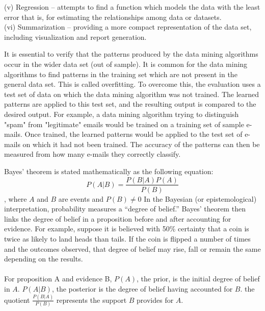 \documentclass[12pt]{article}
\begin{document}
(v) Regression – attempts to find a function which models the data with the least error that is, for estimating the relationships among data or datasets. \\

(vi) Summarization – providing a more compact representation of the data set, including visualization and report generation. \\
\newline

It is essential to verify that the patterns produced by the data mining algorithms occur in the wider data set (out of sample). It is common for the data mining algorithms to find patterns in the training set which are not present in the general data set. This is called overfitting. To overcome this, the evaluation uses a test set of data on which the data mining algorithm was not trained. The learned patterns are applied to this test set, and the resulting output is compared to the desired output. For example, a data mining algorithm trying to distinguish "spam" from "legitimate" emails would be trained on a training set of sample e-mails. Once trained, the learned patterns would be applied to the test set of e-mails on which it had not been trained. The accuracy of the patterns can then be measured from how many e-mails they correctly classify. \\
\newline

Bayes' theorem is stated mathematically as the following equation:
$$ P(A|B)= \frac {P(B|A) P(A)}{P(B)} $$ \newline
, where $A$ and $B$ are events and $P(B)\neq 0$
\newline
\newline
In the Bayesian (or epistemological) interpretation, probability measures a “degree of belief.” Bayes’ theorem then links the degree of belief in a proposition before and after accounting for evidence. For example, suppose it is believed with 50\% certainty that a coin is twice as likely to land heads than tails. If the coin is flipped a number of times and the outcomes observed, that degree of belief may rise, fall or remain the same depending on the results.\\
\\
For proposition A and evidence B,
$P(A)$, the prior, is the initial degree of belief in $A$.
$P(A|B)$, the posterior is the degree of belief having accounted for $B$.
the quotient $\frac{P(B|A)}{P(B)}$ represents the support $B$ provides for $A$.
\end{document}
